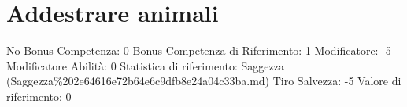 \section{Addestrare animali}\label{addestrare-animali}

\begin{description}
\tightlist
\item[Tags: ABI]
No Bonus Competenza: 0 Bonus Competenza di Riferimento: 1 Modificatore:
-5 Modificatore Abilità: 0 Statistica di riferimento: Saggezza
(Saggezza\%202e64616e72b64e6c9dfb8e24a04c33ba.md) Tiro Salvezza: -5
Valore di riferimento: 0
\end{description}
